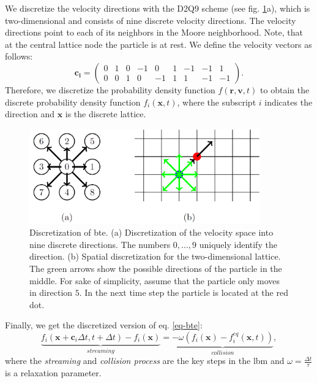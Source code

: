 \documentclass[a4paper,11pt, footsepline]{book}
\begin{document}
We discretize the velocity directions with the D2Q9 scheme (see fig. \ref{fig:mesh}a), which is two-dimensional and consists of nine discrete velocity directions. The velocity directions point to each of its neighbors in the Moore neighborhood. Note, that at the central lattice node the particle is at rest. We define the velocity vectors as follows:
\begin{equation}
\mathbf{c_i}=\begin{pmatrix}
0 & 1 & 0 & -1 & 0 & 1 & -1 & -1 & 1\\
0 & 0 & 1 & 0 & -1 & 1 & 1 & -1 & -1
\end{pmatrix}.
\end{equation}
Therefore, we discretize the probability density function $f(\mathbf{r},\mathbf{v},t)$ to obtain the discrete probability density function $f_{i}(\mathbf{x},t)$, where the subscript $i$ indicates the direction and $\mathbf{x}$ is the discrete lattice.
\begin{figure}
  \begin{center}
   \includegraphics[width=10cm]{logos/Gitter_LBM.png}
   \caption{Discretization of \ac{bte}. (a) Discretization of the velocity space into nine discrete directions. The numbers $0,...,9$ uniquely identify the direction. (b) Spatial discretization for the two-dimensional lattice. The green arrows show the possible directions of the particle in the middle. For sake of simplicity, assume that the particle only moves in direction $5$. In the next time step the particle is located at the red dot.}
  \label{fig:mesh}
  \end{center}
\end{figure}

Finally, we get the discretized version of eq. \ref{eq-bte}:
\begin{equation}
\label{eq-discretizedBTE}
\underbrace{f_{i}(\mathbf{x}+\mathbf{c}_{i}\Delta t, t+\Delta t) - f_{i}(\mathbf{x})}_{streaming}
=\underbrace{-\omega(f_{i}(\mathbf{x})-f_{i}^{eq}(\mathbf{x},t))}_{collision},
\end{equation}
where the \textit{streaming} and \textit{collision process} are the key steps in the \ac{lbm} and $\omega=\frac{\Delta t}{\tau}$ is a relaxation parameter.
\end{document}
